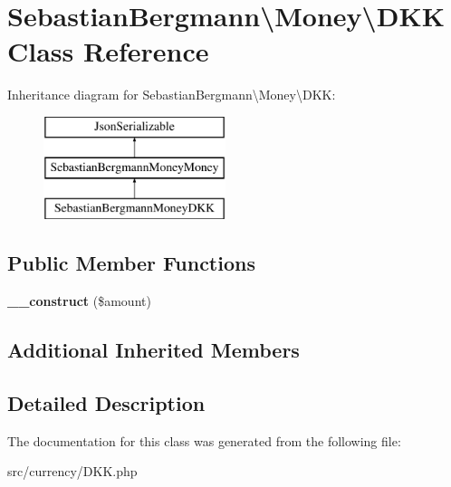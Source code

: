 \hypertarget{classSebastianBergmann_1_1Money_1_1DKK}{}\section{Sebastian\+Bergmann\textbackslash{}Money\textbackslash{}D\+K\+K Class Reference}
\label{classSebastianBergmann_1_1Money_1_1DKK}
Inheritance diagram for Sebastian\+Bergmann\textbackslash{}Money\textbackslash{}D\+K\+K\+:\begin{figure}[H]
\begin{center}
\leavevmode
\includegraphics[height=3.000000cm]{classSebastianBergmann_1_1Money_1_1DKK}
\end{center}
\end{figure}
\subsection*{Public Member Functions}
\begin{DoxyCompactItemize}
\item 
\hypertarget{classSebastianBergmann_1_1Money_1_1DKK_a75293143f158395b90a2c143493d1c7a}{}{\bfseries \+\_\+\+\_\+construct} (\$amount)\label{classSebastianBergmann_1_1Money_1_1DKK_a75293143f158395b90a2c143493d1c7a}

\end{DoxyCompactItemize}
\subsection*{Additional Inherited Members}


\subsection{Detailed Description}


The documentation for this class was generated from the following file\+:\begin{DoxyCompactItemize}
\item 
src/currency/D\+K\+K.\+php\end{DoxyCompactItemize}
